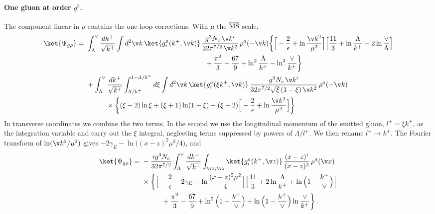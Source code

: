 \paragraph{One gluon at order $g^{3}$.}
The component linear in $\rho$ contains the one-loop corrections. With $\mu$ the $\overline{\rm MS}$ scale,
\begin{align}\label{combinedgrho}
\ket{\Psi_{g\rho}} =\ &\int_{\Lambda}^{\vee}\frac{dk^{+}}{\sqrt{k^{+}}}\int d^{2}\v k\,\ket{g^{a}_{i}(k^{+},\v k)}\,
\frac{g^{3}N_{c}\,\v k^{i}}{32\pi^{7/2}\,\v k^{2}}\,\rho^{a}(-\v k)
\bigg\{\Big[-\frac{2}{\epsilon}+\ln\frac{\v k^{2}}{\mu^{2}}\Big]
\Big[\frac{11}{3}+\ln\frac{\Lambda}{k^{+}}-2\ln\frac{\vee}{\Lambda}\Big]\notag\\
&\hspace{6cm}+\frac{\pi^{2}}{3}-\frac{67}{9}+\ln^{2}\frac{\Lambda}{k^{+}}-\ln^{2}\frac{\vee}{k^{+}}\bigg\}\notag\\
&+\int_{\Lambda}^{\vee}\frac{dk^{+}}{\sqrt{k^{+}}}\int_{\Lambda/k^{+}}^{1-\Lambda/k^{+}}d\xi\int d^{2}\v k\,
\ket{g^{a}_{i}(\xi k^{+},\v k)}\,\frac{g^{3}N_{c}\,\v k^{i}}{32\pi^{7/2}\sqrt{\xi}\,(1-\xi)\,\v k^{2}}\,\rho^{a}(-\v k)\notag\\
&\hspace{1cm}\times\bigg\{(\xi-2)\ln\xi+(\xi+1)\ln(1-\xi)-(\xi-2)\Big[-\frac{2}{\epsilon}+\ln\frac{\v k^{2}}{\mu^{2}}\Big]\bigg\}\,.
\end{align}
In transverse coordinates we combine the two terms. In the second we use the longitudinal momentum of the
emitted gluon, $l^{+}=\xi k^{+}$, as the integration variable and carry out the $\xi$ integral,
neglecting terms suppressed by powers of $\Lambda/l^{+}$. We then rename $l^{+}\to k^{+}$. The Fourier
transform of $\ln(\v k^{2}/\mu^{2})$ gives $-2\gamma_{E}-\ln\big((x-z)^{2}\mu^{2}/4\big)$, and
\begin{align}\label{grhoposition}
\ket{\Psi_{g\rho}} =\ &-\frac{ig^{3}N_{c}}{32\pi^{7/2}}\int_{\Lambda}^{\vee}\frac{dk^{+}}{\sqrt{k^{+}}}\int_{\v x,\v z}
\ket{g^{a}_{i}(k^{+},\v z)}\,\frac{(x-z)^{i}}{(x-z)^{2}}\,\rho^{a}(\v x)\notag\\
&\times\bigg\{\Big[-\frac{2}{\epsilon}-2\gamma_{E}-\ln\frac{(x-z)^{2}\mu^{2}}{4}\Big]
\Big[\frac{11}{3}+2\ln\frac{\Lambda}{k^{+}}+\ln\Big(1-\frac{k^{+}}{\vee}\Big)\Big]\notag\\
&\hspace{1cm}+\frac{\pi^{2}}{3}-\frac{67}{9}+\ln^{2}\Big(1-\frac{k^{+}}{\vee}\Big)
+\ln\Big(1-\frac{k^{+}}{\vee}\Big)\ln\frac{\vee}{k^{+}}\bigg\}\,.
\end{align}
